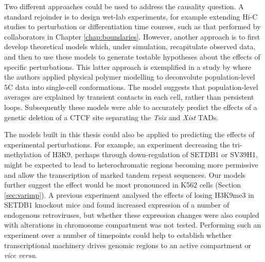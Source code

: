 \documentclass[a4paper,11pt,oneside]{book}
\begin{document}

Two different approaches could be used to address the causality question. A standard rejoinder is to design wet-lab experiments, for example extending Hi-C studies to perturbation or differentiation time courses, such as that performed by collaborators in Chapter \ref{chap:boundaries}. However, another approach is to first develop theoretical models which, under simulation, recapitulate observed data, and then to use these models to generate testable hypotheses about the effects of specific perturbations. This latter approach is exemplified in a study by \citet{Giorgetti2014a} where the authors applied physical polymer modelling to deconvolute population-level 5C data into single-cell conformations. The model suggests that population-level averages are explained by transient contacts in each cell, rather than persistent loops. Subsequently these models were able to accurately predict the effects of a genetic deletion of a CTCF site separating the \emph{Tsix} and \emph{Xist} TADs.\cite{Giorgetti2014a} 

The models built in this thesis could also be applied to predicting the effects of experimental perturbations. For example, an experiment decreasing the tri-methylation of H3K9, perhaps through down-regulation of SETDB1 or SV39H1, might be expected to lead to heterochromatic regions becoming more permissive and allow the transcription of marked tandem repeat sequences.\cite{Kim2012}  Our models further suggest the effect would be most pronounced in K562 cells (Section \ref{sec:varimp}). A previous experiment analysed the effects of losing H3K9me3 in SETDB1 knockout mice and found increased expression of a number of endogenous retroviruses,\cite{Karimi2011} but whether these expression changes were also coupled with alterations in chromosome compartment was not tested. Performing such an experiment over a number of timepoints could help to establish whether transcriptional machinery drives genomic regions to an active compartment or \emph{vice versa}.
\end{document}
